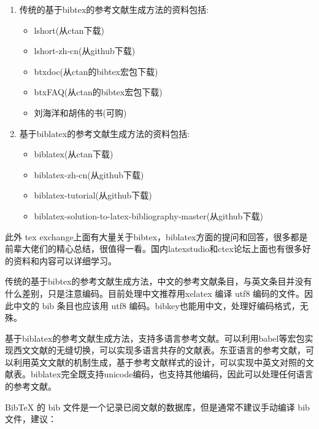 
\begin{enumerate}
\item 传统的基于bibtex的参考文献生成方法的资料包括:

\begin{itemize}
  \item lshort(从ctan下载)
  \item lshort-zh-cn(从github下载)
  \item btxdoc(从ctan的bibtex宏包下载)
  \item btxFAQ(从ctan的bibtex宏包下载)
  \item 刘海洋和胡伟的书(可购)
\end{itemize}

\item 基于biblatex的参考文献生成方法的资料包括:

\begin{itemize}
  \item biblatex(从ctan下载)
  \item biblatex-zh-cn(从github下载)
  \item biblatex-tutorial(从github下载)
  \item biblatex-solution-to-latex-bibliography-master(从github下载)
\end{itemize}

\end{enumerate}

此外 tex exchange上面有大量关于bibtex，biblatex方面的提问和回答，很多都是前辈大佬们的精心总结，很值得一看。国内latexstudio和ctex论坛上面也有很多好的资料和内容可以详细学习。



传统的基于bibtex的参考文献生成方法，中文的参考文献条目，与英文条目并没有什么差别，只是注意编码。目前处理中文推荐用xelatex 编译 utf8 编码的文件。因此中文的 bib 条目也应该用 utf8 编码。bibkey也能用中文，处理好编码格式，无殊。

基于biblatex的参考文献生成方法，支持多语言参考文献。可以利用babel等宏包实现西文文献的无缝切换，可以实现多语言共存的文献表。东亚语言的参考文献，可以利用英文文献的机制生成，基于参考文献样式的设计，可以实现中英文对照的文献表。biblatex完全既支持unicode编码，也支持其他编码，因此可以处理任何语言的参考文献。



BibTeX 的 bib 文件是一个记录已阅文献的数据库，但是通常不建议手动编译 bib
文件，建议：

